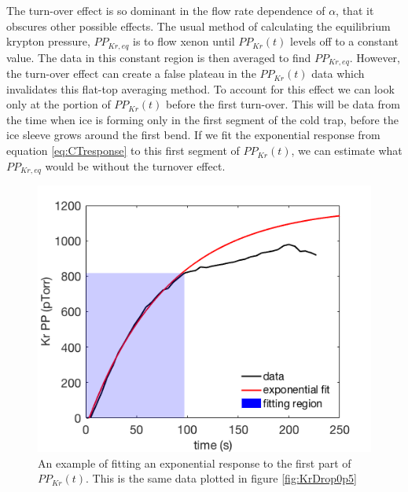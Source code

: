 \documentclass[12pt]{article}
\begin{document}
The turn-over effect is so dominant in the flow rate dependence of $\alpha$, that it obscures other possible effects. The usual method of calculating the equilibrium krypton pressure, $PP_{Kr,eq}$ is to flow xenon until $PP_{Kr}(t)$ levels off to a constant value. The data in this constant region is then averaged to find $PP_{Kr,eq}$. However, the turn-over effect can create a false plateau in the $PP_{Kr}(t)$ data which invalidates this flat-top averaging method. To account for this effect we can look only at the portion of $PP_{Kr}(t)$ before the first turn-over. This will be data from the time when ice is forming only in the first segment of the cold trap, before the ice sleeve grows around the first bend. If we fit the  exponential response from equation \ref{eq:CTresponse} to this first segment of $PP_{Kr}(t)$, we can estimate what $PP_{Kr,eq}$ would be without the turnover effect.
\begin{figure}[h]
  \includegraphics[width=\linewidth]{Figures/turn_over.png}
  \caption{An example of fitting an exponential response to the first part of $PP_{Kr}(t)$. This is the same data plotted in figure \ref{fig:KrDrop0p5}}
  \label{fig:turn_over}
\end{figure}
\end{document}
